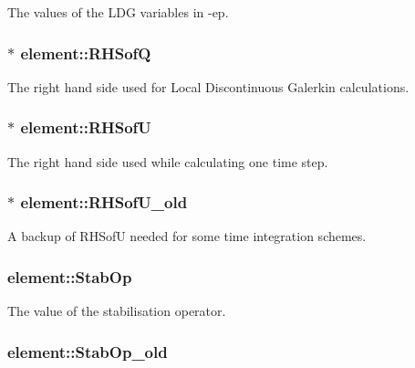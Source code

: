 The values of the L\-D\-G variables in -\/ep. 

\subsubsection[{R\-H\-Sof\-Q}]{$\ast$ element\-::\-R\-H\-Sof\-Q}\label{classelement_a51050bbe3d8c2823a28a245601cd13fd}


The right hand side used for Local Discontinuous Galerkin calculations. 

\subsubsection[{R\-H\-Sof\-U}]{$\ast$ element\-::\-R\-H\-Sof\-U}\label{classelement_ad30a3bbb3101ee29d089fe12cc8302fd}


The right hand side used while calculating one time step. 

\subsubsection[{R\-H\-Sof\-U\-\_\-old}]{$\ast$ element\-::\-R\-H\-Sof\-U\-\_\-old}\label{classelement_ae661a551143416f6b60b2c43890cd8e3}


A backup of R\-H\-Sof\-U needed for some time integration schemes. 

\subsubsection[{Stab\-Op}]{ element\-::\-Stab\-Op}\label{classelement_ae98a7807eda38e991af4be3c9a2f3049}


The value of the stabilisation operator. 

\subsubsection[{Stab\-Op\-\_\-old}]{ element\-::\-Stab\-Op\-\_\-old}\label{classelement_adb01f777e07f9049787784e9e3cb03f9}


